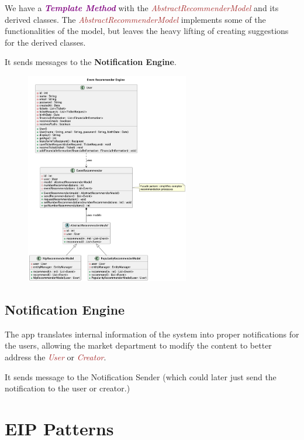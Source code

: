 \documentclass{article}
\newcommand{\designpattern}[1]{\textbf{\textit{\textcolor{purple}{#1}}}}
\newcommand{\designclass}[1]{\textit{\textcolor{brown}{#1}}}
\newcommand{\application}[1]{\textbf{\textcolor{codegreen}{#1}}}
\begin{document}
We have a \designpattern{Template Method} with the \designclass{AbstractRecommenderModel} and its derived classes. The \designclass{AbstractRecommenderModel} implements some of the functionalities of the model, but leaves the heavy lifting of creating suggestions for the derived classes.

It sends messages to the \application{Notification Engine}.

\begin{figure}[h]
    \centering
    \includegraphics[width=\textwidth, height=350px, keepaspectratio]{assets/uml/relations/EventRecommenderEngine.png}
\end{figure}

\FloatBarrier
\subsection{Notification Engine}
The app translates internal information of the system into proper notifications for the users, allowing the market department to modify the content to better address the \designclass{User} or \designclass{Creator}.

It sends message to the Notification Sender (which could later just send the notification to the user or creator.)

\FloatBarrier
\section{EIP Patterns}
\end{document}
